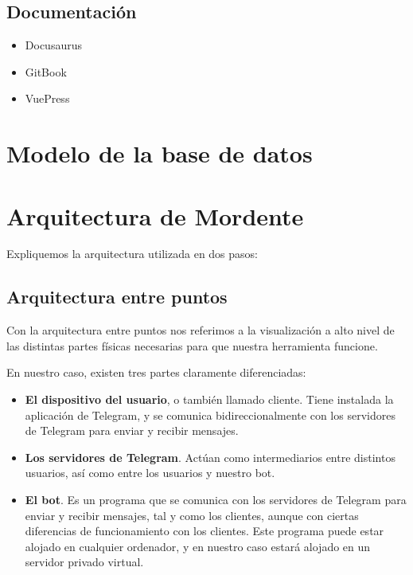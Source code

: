 \subsection{Documentación}\label{subsection:decisionDocumentacion}
\begin{itemize}
    \item Docusaurus
    \item GitBook
    \item VuePress
\end{itemize}


\section{Modelo de la base de datos}

\section{Arquitectura de Mordente}

Expliquemos la arquitectura utilizada en dos pasos:

\subsection{Arquitectura entre puntos}

Con la arquitectura entre puntos nos referimos a la visualización a alto nivel de las distintas partes físicas necesarias para que nuestra herramienta funcione.

En nuestro caso, existen tres partes claramente diferenciadas:

\begin{itemize}
    \item \textbf{El dispositivo del usuario}, o también llamado cliente. Tiene instalada la aplicación de Telegram, y se comunica bidireccionalmente con los servidores de Telegram para enviar y recibir mensajes.
    \item \textbf{Los servidores de Telegram}. Actúan como intermediarios entre distintos usuarios, así como entre los usuarios y nuestro bot.
    \item \textbf{El bot}. Es un programa que se comunica con los servidores de Telegram para enviar y recibir mensajes, tal y como los clientes, aunque con ciertas diferencias de funcionamiento con los clientes. Este programa puede estar alojado en cualquier ordenador, y en nuestro caso estará alojado en un servidor privado virtual.
\end{itemize}


